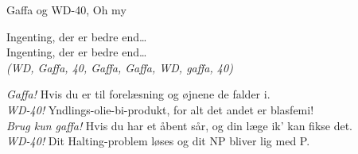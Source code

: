 \begin{song}{Gaffa og WD-40, Oh my}
  \begin{SBSection*}
    Ingenting, der er bedre end\ldots\\
    Ingenting, der er bedre end\ldots\\
    \emph{(WD, Gaffa, 40, Gaffa, Gaffa, WD, gaffa, 40)}
  \end{SBSection*}

  \begin{SBChorus}
    \emph{Gaffa!} Hvis du er til forelæsning og øjnene de falder i.\\
    \emph{WD-40!} Yndlings-olie-bi-produkt, for alt det andet er blasfemi!\\
    \emph{Brug kun gaffa!} Hvis du har et åbent sår, og din læge ik’ kan fikse det.\\
    \emph{WD-40!} Dit Halting-problem løses og dit NP bliver lig med P.
  \end{SBChorus}
\end{song}